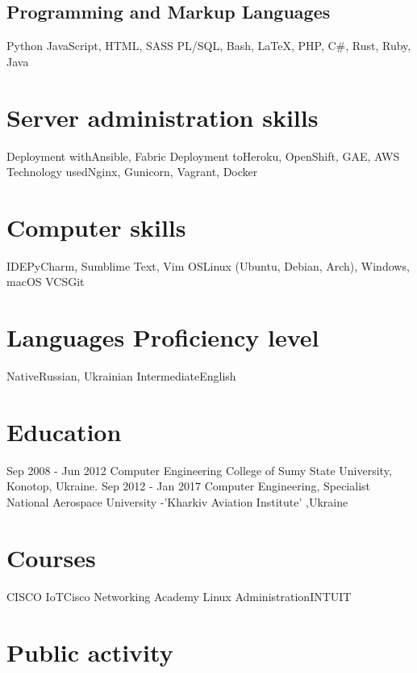 \documentclass[11pt,a4paper]{moderncv}
\begin{document}
	\subsection{Programming and Markup Languages}
	{Python}
    {JavaScript, HTML, SASS}
	{PL/SQL, Bash, LaTeX, PHP, C#, Rust, Ruby, Java}

	\section{Server administration skills}
	\cvline
	{Deployment with}{Ansible, Fabric}
	\cvline
	{Deployment to}{Heroku, OpenShift, GAE, AWS}
	\cvline
	{Technology used}{Nginx, Gunicorn, Vagrant, Docker}
	
	\section{Computer skills}
	\cvline
	{IDE}{PyCharm, Sumblime Text, Vim}
	\cvline
	{OS}{Linux (Ubuntu, Debian, Arch), Windows, macOS}
	\cvline
	{VCS}{Git}

	\section{Languages Proficiency level}
	\cvline
	{Native}{Russian, Ukrainian}
	\cvline
	{Intermediate}{English}
	
	\section{Education}
	\cventry
	{Sep 2008 - Jun 2012}
	{Computer Engineering}
	{College of Sumy State University, Konotop, Ukraine.}
	{}{}{}
	\cventry
	{Sep 2012 - Jan 2017}
	{Computer Engineering, Specialist}
	{National Aerospace University -'Kharkiv Aviation Institute' ,Ukraine}
	{}{}{}
	
	\section{Courses}
	\cvline
	{CISCO IoT}{Cisco Networking Academy}
	\cvline
	{Linux Administration}{INTUIT}
	
	\section{Public activity}
\end{document}
